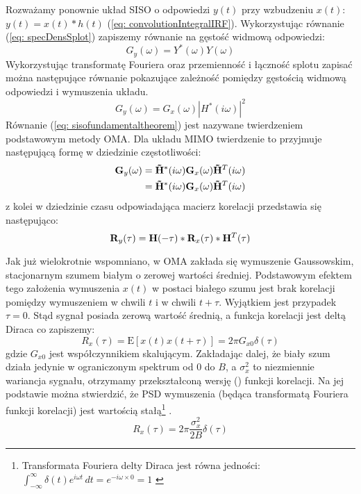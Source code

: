 Rozważamy ponownie układ SISO o odpowiedzi $y(t)$ przy wzbudzeniu $x(t)$: $y(t)=x(t)*h(t)$ (\ref{eq: convolutionIntegralIRF}). Wykorzystując równanie (\ref{eq: specDensSplot}) zapiszemy równanie na gęstość widmową odpowiedzi:
\begin{equation} \label{g}
	G_{y}(\omega) = Y^*(\omega)Y(\omega)
\end{equation}
Wykorzystując transformatę Fouriera oraz przemienność i łączność splotu zapisać można następujące równanie pokazujące zależność pomiędzy gęstością widmową odpowiedzi i wymuszenia układu.
\begin{equation} \label{eq: sisofundamentaltheorem}
	G_{y}(\omega) = G_x(\omega)|H^*(i\omega)|^2
\end{equation}
Równanie (\ref{eq: sisofundamentaltheorem}) jest nazywane twierdzeniem podstawowym  metody OMA. Dla układu MIMO twierdzenie to przyjmuje następującą formę w dziedzinie częstotliwości:
\begin{equation} \label{eq: matrixoutputspectraldensity}
	\begin{split}
		\mathbf{G}_{y}(\omega) &=\mathbf{\tilde{H}}^*(i\omega)\mathbf{G}_x(\omega)\mathbf{\tilde{H}}^T(i\omega)\\
		&=\mathbf{\tilde{H}}^*(i\omega)\mathbf{G}_x(\omega)\mathbf{\tilde{H}}^T(i\omega)
	\end{split}
\end{equation}
z kolei w dziedzinie czasu odpowiadająca macierz korelacji przedstawia się następująco:
\begin{equation} \label{eq: matrixoutputcorrelation}
	\mathbf{R}_y(\tau)=\mathbf{H}(-\tau)*\mathbf{R}_x(\tau)*\mathbf{H}^T(\tau)
\end{equation}

Jak już wielokrotnie wspomniano, w OMA zakłada się wymuszenie Gaussowskim, stacjonarnym szumem białym o zerowej wartości średniej. Podstawowym efektem tego założenia wymuszenia $x(t)$ w postaci białego szumu jest brak korelacji pomiędzy wymuszeniem w chwili $t$ i w chwili $t+\tau$. Wyjątkiem jest przypadek $\tau=0$. Stąd sygnał posiada zerową wartość średnią, a funkcja korelacji jest deltą Diraca co zapiszemy:
\begin{equation}
	R_x(\tau)=\mathrm{E}[x(t)x(t+\tau)] = 2\pi G_{x0} \delta(\tau)
\end{equation} 
gdzie $G_{x0}$ jest współczynnikiem skalującym. Zakładając dalej, że biały szum działa jedynie w ograniczonym spektrum od $0$ do $B$, a $\sigma_x^2$ to niezmiennie wariancja sygnału, otrzymamy przekształconą wersję () funkcji korelacji. Na jej podstawie można stwierdzić, że PSD wymuszenia (będąca transformatą Fouriera funkcji korelacji) jest wartością stałą\footnote{Transformata Fouriera delty Diraca jest równa jedności: $\int_{-\infty}^{\infty} \delta(t) e^{i\omega t}\,dt = e^{-i\omega\times 0}=1$ \parencite{Zielinski2002}} .
\begin{equation} \label{eq: whitenoisecorrelationSISO}
	R_x(\tau)=2\pi \frac{\sigma_x^2}{2B} \delta(\tau)
\end{equation} 

